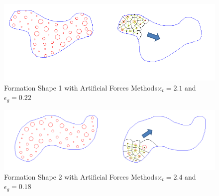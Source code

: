 \documentclass[twoside]{article}
\begin{document}
		\begin{figure}[H]
			\caption{Formation Shape 1 with Artificial Forces Methods:$\epsilon_t = 2.1$ and $\epsilon_g = 0.22$}
			\centerline{\includegraphics[scale = 0.70]{Artificial_Forces_Mesh_1}}
		\end{figure} 		
				\begin{figure}[H]
					\caption{Formation Shape 2 with Artificial Forces Methods:$\epsilon_t = 2.4$ and $\epsilon_g = 0.18$}
					\centerline{\includegraphics[scale = 0.65]{Artificial_Forces_Mesh_2}}
				\end{figure} 		
		
\end{document}
